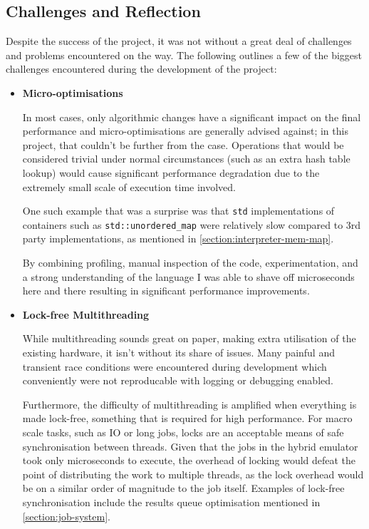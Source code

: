 \subsection{Challenges and Reflection}

Despite the success of the project, it was not without a great deal of challenges and problems encountered on the way. The following outlines a few of the biggest challenges encountered during the development of the project:

\begin{itemize}
    \item \textbf{Micro-optimisations}
    
    In most cases, only algorithmic changes have a significant impact on the final performance and micro-optimisations are generally advised against; in this project, that couldn't be further from the case. Operations that would be considered trivial under normal circumstances (such as an extra hash table lookup) would cause significant performance degradation due to the extremely small scale of execution time involved.
    
    One such example that was a surprise was that \texttt{std} implementations of containers such as \texttt{std::unordered\_map} were relatively slow compared to 3rd party implementations, as mentioned in \autoref{section:interpreter-mem-map}.
    
    By combining profiling, manual inspection of the code, experimentation, and a strong understanding of the language I was able to shave off microseconds here and there resulting in significant performance improvements.

    \item \textbf{Lock-free Multithreading}
    
    While multithreading sounds great on paper, making extra utilisation of the existing hardware, it isn't without its share of issues. Many painful and transient race conditions were encountered during development which conveniently were not reproducable with logging or debugging enabled.
    
    Furthermore, the difficulty of multithreading is amplified when everything is made lock-free, something that is required for high performance. For macro scale tasks, such as IO or long jobs, locks are an acceptable means of safe synchronisation between threads. Given that the jobs in the hybrid emulator took only microseconds to execute, the overhead of locking would defeat the point of distributing the work to multiple threads, as the lock overhead would be on a similar order of magnitude to the job itself. Examples of lock-free synchronisation include the results queue optimisation mentioned in \autoref{section:job-system}.
    

\end{itemize}
